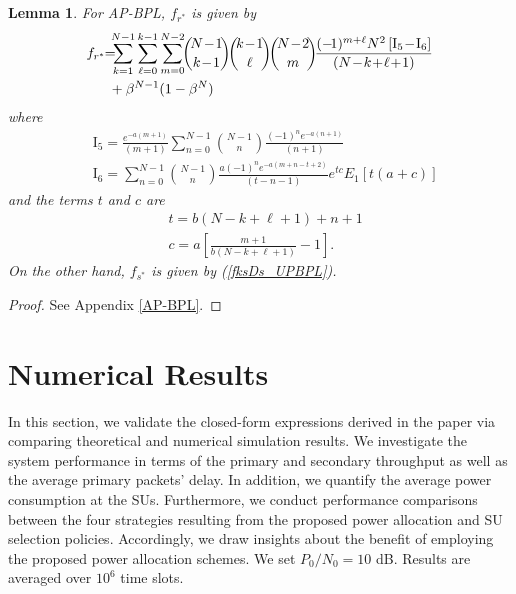 \documentclass[journal,twocolumn]{IEEEtran}
\newtheorem{lemma}[theorem]{Lemma}
\begin{document}
\begin{lemma}\label{lemma5}
For AP-BPL, $f_{r^*}$ is given by
\begin{align} \label{fr_APBPL}
f_{r^*}\!\!=\!\!\!  &
\displaystyle \sum_{k=1}^{N-1} \sum_{\ell=0}^{k-1} \sum_{m=0}^{N-2}\!\!  
{\!N\!-\!1\! \choose\! k\!-\!1\!}\! {\!k\!-\!1\! \choose\! \ell\!} \!{\!N\!-\!2\! \choose\! m\!} 
\!
\frac{(-\!1)^{m+\ell}N^2\left[ \mathrm{I}_{5}\! -\! \mathrm{I}_{6} \right]}{(N\!-\!k\!+\!\ell\!+\!1)}
\notag \\
& +
\beta^{N-1}(1-\beta^{N})  
\end{align}
where
\begin{align}
& \mathrm{I}_{5}=
\frac{e^{-a(m+1)}}{(m+1)}
\displaystyle \sum_{n=0}^{N-1}
{N-1 \choose n} \frac{(-1)^{n} e^{-a(n+1)}}{(n+1)} \label{I5}  \\
& 
\mathrm{I}_{6}\!=\!\! 
\displaystyle \sum_{n=0}^{N-1}\!\! {\!N\!-\!1 \choose\! n\!}\!   
\frac{a(-1)^{n} e^{-a(m+n-t+2)}}{(t-n-1)}
e^{tc} E_{1}\!\left[ t(a+c) \right] \label{I6}
\end{align}
and the terms $t$ and $c$ are 
\begin{align}
& t=b(N-k+\ell+1)+n+1 \label{t} \\
& c=a\left[ \frac{m+1}{b(N-k+\ell+1)}-1 \right]. \label{c}
\end{align}
On the other hand, $f_{s^*}$ is given by (\ref{fksDs_UPBPL}). 
\end{lemma}
\begin{proof}
See Appendix \ref{AP-BPL}.
\end{proof}

\section{Numerical Results}\label{results}
In this section, we validate the closed-form expressions derived in the paper via comparing theoretical and numerical simulation results. We investigate the system performance in terms of the primary and secondary throughput as well as the average primary packets' delay. In addition, we quantify the average power consumption at the SUs. Furthermore, we conduct performance comparisons between the four strategies resulting from the proposed power allocation and SU selection policies. Accordingly, we draw insights about the benefit of employing the proposed power allocation schemes. We set $P_{0}/N_{0}=10$ dB. Results are averaged over $10^6$ time slots.
\end{document}
